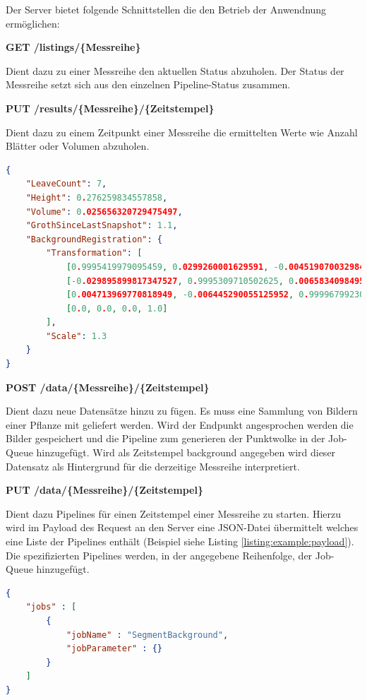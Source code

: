 \documentclass[12pt,titlepage, twoside]{article}
\begin{document}
Der Server bietet folgende Schnittstellen die den Betrieb der Anwendnung ermöglichen:

\textbf{GET /listings/\{Messreihe\}}

Dient dazu zu einer Messreihe den aktuellen Status abzuholen. Der Status der Messreihe setzt sich aus den einzelnen Pipeline-Status zusammen.

\textbf{PUT /results/\{Messreihe\}/\{Zeitstempel\}}

Dient dazu zu einem Zeitpunkt einer Messreihe die ermittelten Werte wie Anzahl Blätter oder Volumen abzuholen.

\begin{lstlisting}[language=json, caption={Beispiel Ergebnisse eines Zeitstempels}, captionpos=b, label=listing:example:result]
{
    "LeaveCount": 7,
    "Height": 0.276259834557858,
    "Volume": 0.025656320729475497,
    "GrothSinceLastSnapshot": 1.1,
    "BackgroundRegistration": {
        "Transformation": [
            [0.9995419979095459, 0.0299260001629591, -0.004519070032984018, -0.030479200184345245], 
            [-0.029895899817347527, 0.9995309710502625, 0.0065834098495543, 0.025272000581026077], 
            [0.004713969770818949, -0.006445290055125952, 0.9999679923057556, 0.0013244400033727288], 
            [0.0, 0.0, 0.0, 1.0]
        ],
        "Scale": 1.3
    }
}
\end{lstlisting}

\textbf{POST /data/\{Messreihe\}/\{Zeitstempel\}}

Dient dazu neue Datensätze hinzu zu fügen. Es muss eine Sammlung von Bildern einer Pflanze mit geliefert werden. 
Wird der Endpunkt angesprochen werden die Bilder gespeichert und die Pipeline zum generieren der Punktwolke in der Job-Queue hinzugefügt.
Wird als Zeitstempel \glqq background\grqq{} angegeben wird dieser Datensatz als Hintergrund für die derzeitige Messreihe interpretiert.

\textbf{PUT /data/\{Messreihe\}/\{Zeitstempel\}}

Dient dazu Pipelines für einen Zeitstempel einer Messreihe zu starten. Hierzu wird im Payload des Request an den Server eine JSON-Datei übermittelt welches eine Liste der Pipelines enthält (Beispiel siehe Listing \ref{listing:example:payload}).
Die spezifizierten Pipelines werden, in der angegebene Reihenfolge, der Job-Queue hinzugefügt.
\\

\begin{lstlisting}[language=json, caption={Beispiel Payload zum starten einer Pipeline}, captionpos=b, label=listing:example:payload]
{
    "jobs" : [
        {
            "jobName" : "SegmentBackground",
            "jobParameter" : {}
        }
    ]
}
\end{lstlisting}
\end{document}
